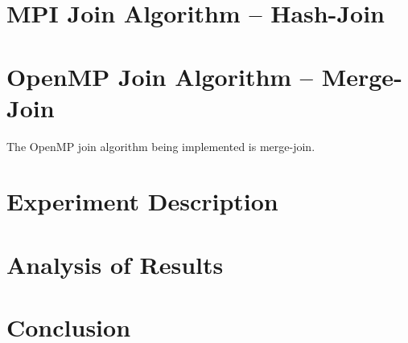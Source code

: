 \documentclass[journal,draftclsnofoot]{IEEEtran}
\begin{document}
\section{MPI Join Algorithm -- Hash-Join}\label{mpi}
\section{OpenMP Join Algorithm -- Merge-Join}\label{omp}
The OpenMP join algorithm being implemented is merge-join.
\section{Experiment Description}\label{desc}
\section{Analysis of Results}\label{ana}
\section{Conclusion}\label{conc}


\cleardoublepage
\onecolumn
\end{document}
